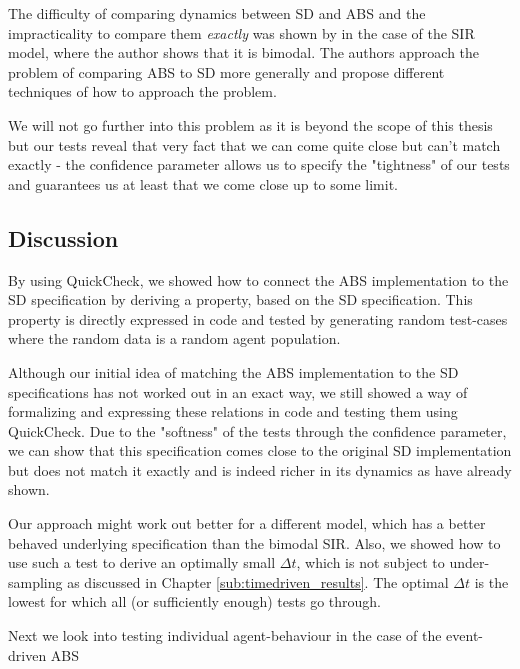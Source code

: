 The difficulty of comparing dynamics between SD and ABS and the impracticality to compare them \textit{exactly} was shown by \cite{macal_agent-based_2010} in the case of the SIR model, where the author shows that it is bimodal. The authors \cite{figueredo_comparing_2014} approach the problem of comparing ABS to SD more generally and propose different techniques of how to approach the problem.

We will not go further into this problem as it is beyond the scope of this thesis but our tests reveal that very fact that we can come quite close but can't match exactly - the confidence parameter allows us to specify the "tightness" of our tests and guarantees us at least that we come close up to some limit.

\subsection{Discussion}
By using QuickCheck, we showed how to connect the ABS implementation to the SD specification by deriving a property, based on the SD specification. This property is directly expressed in code and tested by generating random test-cases where the random data is a random agent population. 

Although our initial idea of matching the ABS implementation to the SD specifications has not worked out in an exact way, we still showed a way of formalizing and expressing these relations in code and testing them using QuickCheck. Due to the "softness" of the tests through the confidence parameter, we can show that this specification comes close to the original SD implementation but does not match it exactly and is indeed richer in its dynamics as \cite{macal_agent-based_2010, figueredo_comparing_2014} have already shown. 

Our approach might work out better for a different model, which has a better behaved underlying specification than the bimodal SIR. Also, we showed how to use such a test to derive an optimally small $\Delta t$, which is not subject to under-sampling as discussed in Chapter \ref{sub:timedriven_results}. The optimal $\Delta t$ is the lowest for which all (or sufficiently enough) tests go through. %

Next we look into testing individual agent-behaviour in the case of the event-driven ABS